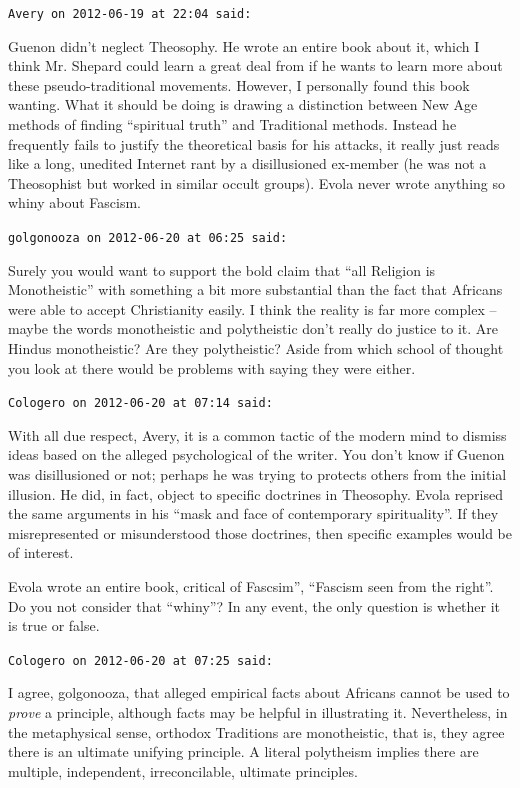 \begin{footnotesize}
\begin{sffamily}
\texttt{Avery on 2012-06-19 at 22:04 said:}

Guenon didn't neglect Theosophy. He wrote an entire book about it, which I think Mr. Shepard could learn a great deal from if he wants to learn more about these pseudo-traditional movements. However, I personally found this book wanting. What it should be doing is drawing a distinction between New Age methods of finding ``spiritual truth'' and Traditional methods. Instead he frequently fails to justify the theoretical basis for his attacks, it really just reads like a long, unedited Internet rant by a disillusioned ex-member (he was not a Theosophist but worked in similar occult groups). Evola never wrote anything so whiny about Fascism.

\hfill

\texttt{golgonooza on 2012-06-20 at 06:25 said:}

Surely you would want to support the bold claim that ``all Religion is Monotheistic'' with something a bit more substantial than the fact that Africans were able to accept Christianity easily. I think the reality is far more complex -- maybe the words monotheistic and polytheistic don't really do justice to it. Are Hindus monotheistic? Are they polytheistic? Aside from which school of thought you look at there would be problems with saying they were either.

\hfill

\texttt{Cologero on 2012-06-20 at 07:14 said:}

With all due respect, Avery, it is a common tactic of the modern mind to dismiss ideas based on the alleged psychological of the writer. You don't know if Guenon was disillusioned or not; perhaps he was trying to protects others from the initial illusion. He did, in fact, object to specific doctrines in Theosophy. Evola reprised the same arguments in his ``mask and face of contemporary spirituality''. If they misrepresented or misunderstood those doctrines, then specific examples would be of interest.

Evola wrote an entire book, critical of Fascsim'', ``Fascism seen from the right''. Do you not consider that ``whiny''? In any event, the only question is whether it is true or false.

\hfill

\texttt{Cologero on 2012-06-20 at 07:25 said:}

I agree, golgonooza, that alleged empirical facts about Africans cannot be used to \emph{prove} a principle, although facts may be helpful in illustrating it. Nevertheless, in the metaphysical sense, orthodox Traditions are monotheistic, that is, they agree there is an ultimate unifying principle. A literal polytheism implies there are multiple, independent, irreconcilable, ultimate principles.


\end{sffamily}
\end{footnotesize}
